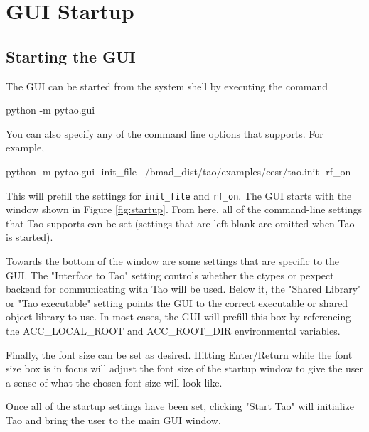 \chapter{GUI Startup}
\label{s:gui.startup}

\section{Starting the GUI}

The GUI can be started from the system shell by executing the command
\begin{example}
  python -m pytao.gui
\end{example}
You can also specify any of the command line options that \tao supports.  For example,
\begin{example}
  python -m pytao.gui -init_file ~/bmad_dist/tao/examples/cesr/tao.init -rf_on
\end{example}
This will prefill the settings for \texttt{init_file} and \texttt{rf_on}.  The GUI starts with the
window shown in Figure \ref{fig:startup}. From here, all of the command-line settings that Tao
supports can be set (settings that are left blank are omitted when Tao is started).

Towards the bottom of the window are some settings that are specific to the GUI.  The "Interface to
Tao" setting controls whether the ctypes or pexpect backend for communicating with Tao will be used.
Below it, the "Shared Library" or "Tao executable" setting points the GUI to the correct executable
or shared object library to use.  In most cases, the GUI will prefill this box by referencing the
ACC_LOCAL_ROOT and ACC_ROOT_DIR environmental variables.

Finally, the font size can be set as desired. Hitting Enter/Return while the font size box is in
focus will adjust the font size of the startup window to give the user a sense of what the chosen
font size will look like.

Once all of the startup settings have been set, clicking "Start Tao" will initialize Tao and bring
the user to the main GUI window.


